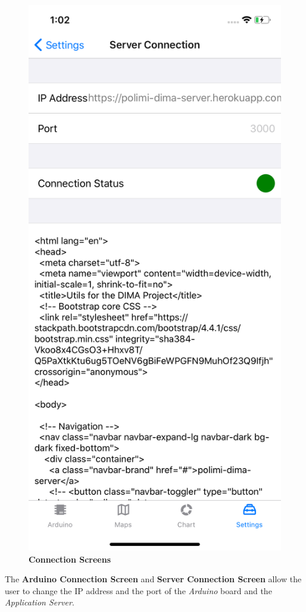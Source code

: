 \begin{figure}[H]
\includegraphics[height=.6\textheight]{./img/ui/server.png}
\caption{\textbf{Connection Screens}}
\end{figure}
\begin{center}
The \textbf{Arduino Connection Screen} and \textbf{Server Connection Screen} allow the user to change the IP address and the port of the \textit{Arduino} board and the \textit{Application Server}.
\end{center}

